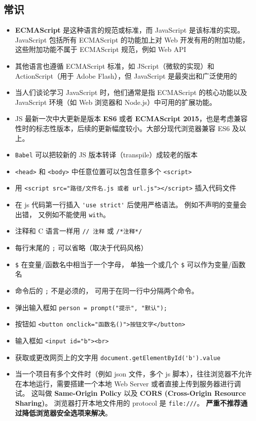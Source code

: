\subsection{常识}
\begin{itemize}
\item \textbf{ECMAScript} 是这种语言的规范或标准，而 JavaScript 是该标准的实现。JavaScript 包括所有 ECMAScript 的功能加上对 Web 开发有用的附加功能，这些附加功能不属于 ECMAScript 规范，例如 Web API
\item 其他语言也遵循 ECMAScript 标准，如 JScript（微软的实现）和 ActionScript（用于 Adobe Flash），但 JavaScript 是最突出和广泛使用的
\item 当人们谈论学习 JavaScript 时，他们通常是指 ECMAScript 的核心功能以及 JavaScript 环境（如 Web 浏览器和 Node.js）中可用的扩展功能。
\item JS 最新一次中大更新是版本 \textbf{ES6} 或者 \textbf{ECMAScript 2015}，也是考虑兼容性时的标志性版本，后续的更新幅度较小。大部分现代浏览器兼容 ES6 及以上。
\item \verb`Babel` 可以把较新的 JS 版本转译（transpile）成较老的版本
\item \verb|<head>| 和 \verb|<body>| 中任意位置可以包含任意多个 \verb|<script>|
\item 用 \verb|<script src="路径/文件名.js 或者 url.js"></script>| 插入代码文件
\item 在 js 代码第一行插入 \verb|'use strict'| 后使用严格语法。 例如不声明的变量会出错， 又例如不能使用 \verb|with|。
\item 注释和 C 语言一样用 \verb|// 注释| 或 \verb|/*注释*/|
\item 每行末尾的 \verb`;` 可以省略（取决于代码风格）
\item \verb|$| 在变量/函数名中相当于一个字母， 单独一个或几个 \verb|$| 可以作为变量/函数名
\item 命令后的 \verb|;| 不是必须的， 可用于在同一行中分隔两个命令。
\item 弹出输入框如 \verb|person = prompt("提示", "默认");|
\item 按钮如 \verb|<button onclick="函数名()">按钮文字</button>|
\item 输入框如 \verb|<input id="b"><br>|
\item 获取或更改网页上的文字用 \verb|document.getElementById('b').value|
\item 当一个项目有多个文件时（例如 json 文件，多个 js 脚本），往往浏览器不允许在本地运行，需要搭建一个本地 Web Server 或者直接上传到服务器进行调试。 这叫做 \textbf{Same-Origin Policy} 以及  \textbf{CORS (Cross-Origin Resource Sharing)}。 浏览器打开本地文件用的 protocol 是 \verb`file:///`。 \textbf{严重不推荐通过降低浏览器安全选项来解决}。
\end{itemize}

